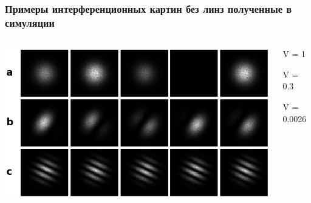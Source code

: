 \begin{frame}
\frametitle{Примеры интерференционных картин без линз полученные в симуляции}
\begin{columns}
  \centering
   \includegraphics[scale=0.4]{images/visib_expl.png}

\begin{description}
    \item V = 1
    \vspace{30pt}
    \item V = 0.3
    \vspace{30pt}
    \item V = 0.0026
\end{description}

\end{columns} 
\end{frame}


